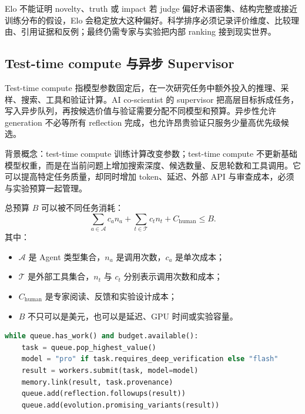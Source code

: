 \begin{warningbox}{Elo 不能证明 novelty、truth 或 impact}
若 judge 偏好术语密集、结构完整或接近训练分布的假设，Elo 会稳定放大这种偏好。科学排序必须记录评价维度、比较理由、引用证据和反例；最终仍需专家与实验把内部 ranking 接到现实世界。
\end{warningbox}


\subsection{Test-time compute 与异步 Supervisor}

Test-time compute 指模型参数固定后，在一次研究任务中额外投入的推理、采样、搜索、工具和验证计算。AI co-scientist 的 supervisor 把高层目标拆成任务，写入异步队列，再按候选价值与验证需要分配不同模型和预算。异步性允许 generation 不必等所有 reflection 完成，也允许昂贵验证只服务少量高优先级候选。

\begin{knowledgebox}{背景概念：test-time compute}
训练计算改变参数；test-time compute 不更新基础模型权重，而是在当前问题上增加搜索深度、候选数量、反思轮数和工具调用。它可以提高特定任务质量，却同时增加 token、延迟、外部 API 与审查成本，必须与实验预算一起管理。
\end{knowledgebox}

总预算 $B$ 可以被不同任务消耗：
$$
\sum_{a\in\mathcal{A}} c_a n_a
+\sum_{t\in\mathcal{T}} c_t n_t
+C_{\text{human}}
\le B.
$$
其中：
\begin{itemize}
  \item $\mathcal{A}$ 是 Agent 类型集合，$n_a$ 是调用次数，$c_a$ 是单次成本；
  \item $\mathcal{T}$ 是外部工具集合，$n_t$ 与 $c_t$ 分别表示调用次数和成本；
  \item $C_{\text{human}}$ 是专家阅读、反馈和实验设计成本；
  \item $B$ 不只可以是美元，也可以是延迟、GPU 时间或实验容量。
\end{itemize}

\begin{lstlisting}[language=Python,caption={异步 Supervisor 的资源路由示意}]
while queue.has_work() and budget.available():
    task = queue.pop_highest_value()
    model = "pro" if task.requires_deep_verification else "flash"
    result = workers.submit(task, model=model)
    memory.link(result, task.provenance)
    queue.add(reflection.followups(result))
    queue.add(evolution.promising_variants(result))
\end{lstlisting}

